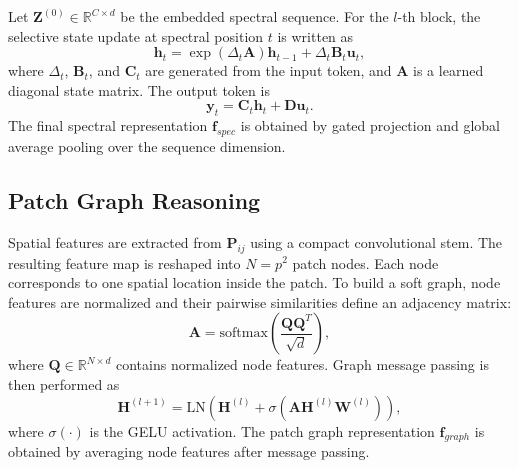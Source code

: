 Let $\mathbf{Z}^{(0)}\in\mathbb{R}^{C\times d}$ be the embedded spectral sequence. For the $l$-th block, the selective state update at spectral position $t$ is written as
\begin{equation}
\mathbf{h}_{t}=\exp(\Delta_t\mathbf{A})\mathbf{h}_{t-1}+\Delta_t\mathbf{B}_t\mathbf{u}_t,
\end{equation}
where $\Delta_t$, $\mathbf{B}_t$, and $\mathbf{C}_t$ are generated from the input token, and $\mathbf{A}$ is a learned diagonal state matrix. The output token is
\begin{equation}
\mathbf{y}_{t}=\mathbf{C}_{t}\mathbf{h}_{t}+\mathbf{D}\mathbf{u}_{t}.
\end{equation}
The final spectral representation $\mathbf{f}_{spec}$ is obtained by gated projection and global average pooling over the sequence dimension.

\subsection{Patch Graph Reasoning}
Spatial features are extracted from $\mathbf{P}_{ij}$ using a compact convolutional stem. The resulting feature map is reshaped into $N=p^2$ patch nodes. Each node corresponds to one spatial location inside the patch. To build a soft graph, node features are normalized and their pairwise similarities define an adjacency matrix:
\begin{equation}
\mathbf{A}=\mathrm{softmax}\left(\frac{\mathbf{Q}\mathbf{Q}^{T}}{\sqrt{d}}\right),
\end{equation}
where $\mathbf{Q}\in\mathbb{R}^{N\times d}$ contains normalized node features. Graph message passing is then performed as
\begin{equation}
\mathbf{H}^{(l+1)}=\mathrm{LN}\left(\mathbf{H}^{(l)}+\sigma(\mathbf{A}\mathbf{H}^{(l)}\mathbf{W}^{(l)})\right),
\end{equation}
where $\sigma(\cdot)$ is the GELU activation. The patch graph representation $\mathbf{f}_{graph}$ is obtained by averaging node features after message passing.

